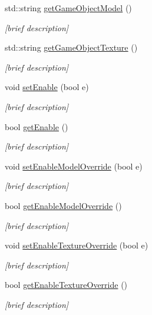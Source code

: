 \begin{DoxyCompactItemize}
std\-::string \hyperlink{classgame_script_a15f2bf8119cf880213c32b728d7e0931}{get\-Game\-Object\-Model} ()
\begin{DoxyCompactList}\small\item\em \mbox{[}brief description\mbox{]} \end{DoxyCompactList}\item 
std\-::string \hyperlink{classgame_script_a0d13eab01ef6a5536e00334a8b8d19dc}{get\-Game\-Object\-Texture} ()
\begin{DoxyCompactList}\small\item\em \mbox{[}brief description\mbox{]} \end{DoxyCompactList}\item 
void \hyperlink{classgame_script_ae83597f59fc5fe902e94366437c3ebce}{set\-Enable} (bool e)
\begin{DoxyCompactList}\small\item\em \mbox{[}brief description\mbox{]} \end{DoxyCompactList}\item 
bool \hyperlink{classgame_script_a3bdac0a9ffbfa1463f335b30697f2286}{get\-Enable} ()
\begin{DoxyCompactList}\small\item\em \mbox{[}brief description\mbox{]} \end{DoxyCompactList}\item 
void \hyperlink{classgame_script_a3f97bdd1d6e0c0e45a15798dbfcb30a2}{set\-Enable\-Model\-Override} (bool e)
\begin{DoxyCompactList}\small\item\em \mbox{[}brief description\mbox{]} \end{DoxyCompactList}\item 
bool \hyperlink{classgame_script_a3980d3b9a95dfe4776826be4cdc58642}{get\-Enable\-Model\-Override} ()
\begin{DoxyCompactList}\small\item\em \mbox{[}brief description\mbox{]} \end{DoxyCompactList}\item 
void \hyperlink{classgame_script_ac2f6afed1ea6d697a6792424a2f04851}{set\-Enable\-Texture\-Override} (bool e)
\begin{DoxyCompactList}\small\item\em \mbox{[}brief description\mbox{]} \end{DoxyCompactList}\item 
bool \hyperlink{classgame_script_a74d9584739842d0bd16c375fadb3bd88}{get\-Enable\-Texture\-Override} ()
\begin{DoxyCompactList}\small\item\em \mbox{[}brief description\mbox{]} \end{DoxyCompactList}\end{DoxyCompactItemize}



